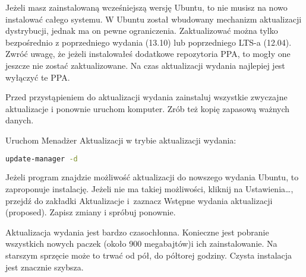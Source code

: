 Jeżeli masz zainstalowaną wcześniejszą wersję Ubuntu, to nie musisz na nowo instalować całego systemu. W Ubuntu został wbudowany mechanizm aktualizacji dystrybucji, jednak ma on pewne ograniczenia. Zaktualizować można tylko bezpośrednio z poprzedniego wydania (13.10) lub poprzedniego LTS-a (12.04). Zwróć uwagę, że jeżeli instalowałeś dodatkowe repozytoria PPA, to mogły one jeszcze nie zostać zaktualizowane. Na czas aktualizacji wydania najlepiej jest wyłączyć te PPA.

Przed przystąpieniem do aktualizacji wydania zainstaluj wszystkie zwyczajne aktualizacje i ponownie uruchom komputer. Zrób też kopię zapasową ważnych danych.

Uruchom Menadżer Aktualizacji w trybie aktualizacji wydania:

\begin{lstlisting}[language=bash]
update-manager -d
\end{lstlisting}

Jeżeli program znajdzie możliwość aktualizacji do nowszego wydania Ubuntu, to zaproponuje instalację. Jeżeli nie ma takiej możliwości, kliknij na \textcolor{ubuntu_orange}{Ustawienia\ldots}, przejdź do zakładki \textcolor{ubuntu_orange}{Aktualizacje} i~zaznacz \textcolor{ubuntu_orange}{Wstępne wydania aktualizacji (proposed)}. Zapisz zmiany i spróbuj ponownie.

Aktualizacja wydania jest bardzo czasochłonna. Konieczne jest pobranie wszystkich nowych paczek (około 900 megabajtów)i ich zainstalowanie. Na starszym sprzęcie może to trwać od pół, do półtorej godziny. Czysta instalacja jest znacznie szybsza.
